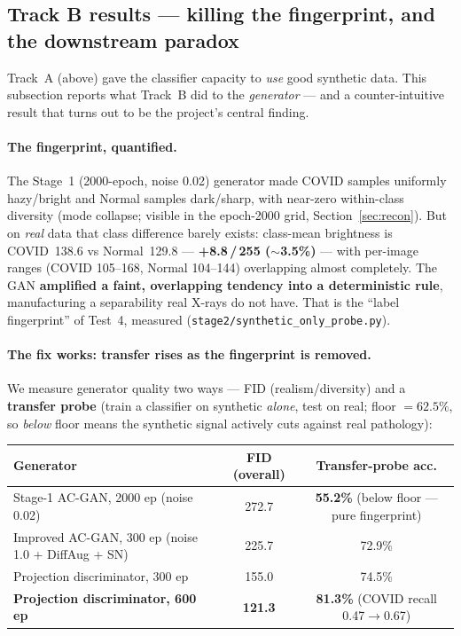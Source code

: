\documentclass[11pt]{article}
\newcommand{\code}[1]{\texttt{#1}}
\begin{document}
\subsection{Track B results --- killing the fingerprint, and the downstream paradox}
\label{sec:trackBresults}
Track~A (above) gave the classifier capacity to \emph{use} good synthetic data.
This subsection reports what Track~B did to the \emph{generator} --- and a
counter-intuitive result that turns out to be the project's central finding.

\paragraph{The fingerprint, quantified.} The Stage~1 (2000-epoch, noise 0.02)
generator made COVID samples uniformly hazy/bright and Normal samples dark/sharp,
with near-zero within-class diversity (mode collapse; visible in the epoch-2000 grid,
Section~\ref{sec:recon}). But on \emph{real} data that class difference barely
exists: class-mean brightness is COVID~138.6 vs Normal~129.8 --- \textbf{+8.8\,/\,255
($\sim$3.5\%)} --- with per-image ranges (COVID 105--168, Normal 104--144) overlapping
almost completely. The GAN \textbf{amplified a faint, overlapping tendency into a
deterministic rule}, manufacturing a separability real X-rays do not have. That is
the ``label fingerprint'' of Test~4, measured (\code{stage2/synthetic\_only\_probe.py}).

\paragraph{The fix works: transfer rises as the fingerprint is removed.} We measure
generator quality two ways --- FID (realism/diversity) and a \textbf{transfer probe}
(train a classifier on synthetic \emph{alone}, test on real; floor $=62.5\%$, so
\emph{below} floor means the synthetic signal actively cuts against real pathology):

\begin{table}[htbp]
\centering\small
\begin{tabular}{@{}lcc@{}}
\toprule
\textbf{Generator} & \textbf{FID (overall)} & \textbf{Transfer-probe acc.} \\
\midrule
Stage-1 AC-GAN, 2000 ep (noise 0.02) & 272.7 & \textbf{55.2\%} (below floor --- pure fingerprint) \\
Improved AC-GAN, 300 ep (noise 1.0 + DiffAug + SN) & 225.7 & 72.9\% \\
Projection discriminator, 300 ep & 155.0 & 74.5\% \\
\textbf{Projection discriminator, 600 ep} & \textbf{121.3} & \textbf{81.3\%} (COVID recall 0.47$\to$0.67) \\
\bottomrule
\end{tabular}
\end{table}
\end{document}
